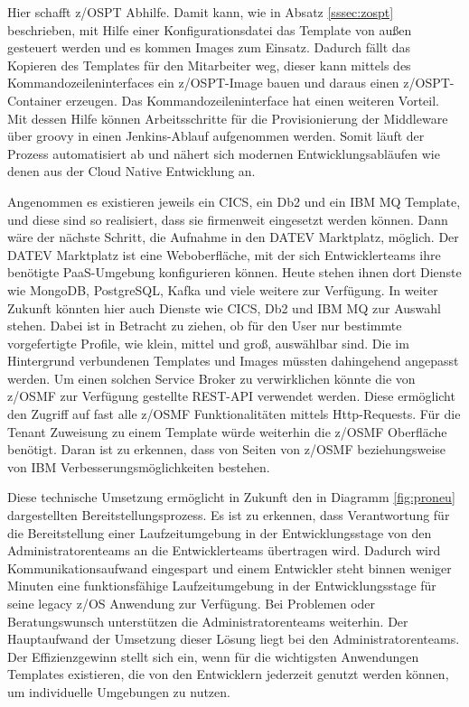 Hier schafft z/OSPT Abhilfe.
Damit kann, wie in Absatz \ref{sssec:zospt} beschrieben, mit Hilfe einer Konfigurationsdatei das Template von außen gesteuert werden und es kommen Images zum Einsatz.
Dadurch fällt das Kopieren des Templates für den Mitarbeiter weg, dieser kann mittels des Kommandozeileninterfaces ein z/OSPT-Image bauen und daraus einen z/OSPT-Container erzeugen.
Das Kommandozeileninterface hat einen weiteren Vorteil.
Mit dessen Hilfe können Arbeitsschritte für die Provisionierung der Middleware über groovy in einen Jenkins-Ablauf aufgenommen werden.
Somit läuft der Prozess automatisiert ab und nähert sich modernen Entwicklungsabläufen wie denen aus der Cloud Native Entwicklung an.

Angenommen es existieren jeweils ein CICS, ein Db2 und ein IBM MQ Template, und diese sind so realisiert, dass sie firmenweit eingesetzt werden können.
Dann wäre der nächste Schritt, die Aufnahme in den \glqq DATEV Marktplatz\grqq, möglich.
Der \glqq DATEV Marktplatz\grqq{} ist eine Weboberfläche, mit der sich Entwicklerteams ihre benötigte PaaS-Umgebung konfigurieren können.
Heute stehen ihnen dort Dienste wie MongoDB, PostgreSQL, Kafka und viele weitere zur Verfügung.
In weiter Zukunft könnten hier auch Dienste wie CICS, Db2 und IBM MQ zur Auswahl stehen.
Dabei ist in Betracht zu ziehen, ob für den User nur bestimmte vorgefertigte Profile, wie \glqq klein\grqq, \glqq mittel\grqq{} und \glqq groß\grqq, auswählbar sind.
Die im Hintergrund verbundenen Templates und Images müssten dahingehend angepasst werden.
Um einen solchen \glqq Service Broker\grqq{} zu verwirklichen könnte die von z/OSMF zur Verfügung gestellte REST-API verwendet werden.
Diese ermöglicht den Zugriff auf fast alle z/OSMF Funktionalitäten mittels Http-Requests.
Für die \glqq Tenant\grqq{} Zuweisung zu einem Template würde weiterhin die z/OSMF Oberfläche benötigt.
Daran ist zu erkennen, dass von Seiten von z/OSMF beziehungsweise von IBM Verbesserungsmöglichkeiten bestehen.

Diese technische Umsetzung ermöglicht in Zukunft den in Diagramm \ref{fig:proneu} dargestellten Bereitstellungsprozess.
Es ist zu erkennen, dass Verantwortung für die Bereitstellung einer Laufzeitumgebung in der Entwicklungsstage von den Administratorenteams an die Entwicklerteams übertragen wird.
Dadurch wird Kommunikationsaufwand eingespart und einem Entwickler steht binnen weniger Minuten eine funktionsfähige Laufzeitumgebung in der Entwicklungsstage für seine legacy z/OS Anwendung zur Verfügung.
Bei Problemen oder Beratungswunsch unterstützen die Administratorenteams weiterhin.
Der Hauptaufwand der Umsetzung dieser Lösung liegt bei den Administratorenteams.
Der Effizienzgewinn stellt sich ein, wenn für die wichtigsten Anwendungen Templates existieren, die von den Entwicklern jederzeit genutzt werden können, um individuelle Umgebungen zu nutzen.


